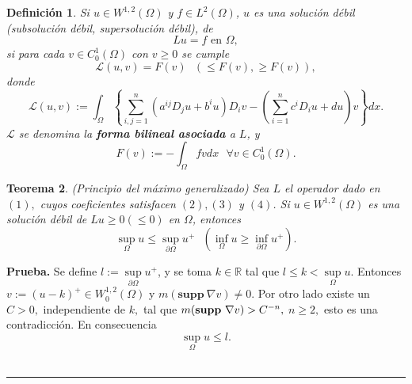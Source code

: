 \documentclass{article}
\newtheorem{theorem}{Teorema}
\newtheorem{definition}[theorem]{Definici\'{o}n}
\newenvironment{proof}[1][Prueba]{\textbf{#1.} }{\ \rule{0.5em}{0.5em}}
\begin{document}
\begin{definition}
Si $u\in W^{1,2}(\Omega )$ y $f\in L^{2}\left( \Omega \right) $, $u$ es una
soluci\'{o}n d\'{e}bil (subsoluci\'{o}n d\'{e}bil, supersoluci\'{o}n
d\'{e}bil), de 
\begin{equation*}
Lu=f\text{ \ \ en }\Omega ,
\end{equation*}
si para cada $v\in C_{0}^{1}\left( \Omega \right) $ con $v\geq 0$ se cumple 
\begin{equation}
\mathcal{L}\left( u,v\right) =F\left( v\right) \text{ \ }\left( \leq F\left(
v\right) ,\geq F\left( v\right) \right) ,  \tag{5}
\end{equation}
donde 
\begin{equation}
\mathcal{L}\left( u,v\right) :=\int_{\Omega }\left\{ \sum_{i,j=1}^{n}\left(
a^{ij}D_{j}u+b^{i}u\right) D_{i}v-\left( \sum_{i=1}^{n}c^{i}D_{i}u+du\right)
v\right\} dx.  \tag{6}
\end{equation}
$\mathcal{L}$ se denomina la \textbf{forma bilineal asociada} a $L$, y 
\begin{equation}
F\left( v\right) :=-\int_{\Omega }fvdx\text{ \ }\forall v\in C_{0}^{1}\left(
\Omega \right) .  \tag{7}
\end{equation}
\end{definition}

\begin{theorem}
(Principio del m\'{a}ximo generalizado) Sea $L$ el operador dado en $(1),$
cuyos coeficientes satisfacen $\left( 2\right) ,\left( 3\right) $ y $\left(
4\right) $. Si $u\in W^{1,2}\left( \Omega \right) $ es una soluci\'{o}n
d\'{e}bil de $Lu\geq 0\left( \leq 0\right) $ en $\Omega $, entonces 
\begin{equation*}
\sup_{\Omega }u\leq \sup_{\partial \Omega }u^{+}\text{ \ }\left(
\inf_{\Omega }u\geq \inf_{\partial \Omega }u^{+}\right) .
\end{equation*}
\end{theorem}

\begin{proof}
Se define $l:=\sup\limits_{\partial \Omega }u^{+}$, y se toma $k\in \mathbb{R%
}$ tal que $l\leq k<\sup\limits_{\Omega }u$. Entonces $v:=\left( u-k\right)
^{+}\in W_{0}^{1,2}\left( \Omega \right) $ y $m(\mathbf{supp\ }\nabla v)\neq
0.$ Por otro lado existe un $C>0,$ independiente de $k,$ tal que $m(\mathbf{%
supp\ }\nabla v)>C^{-n},$ $n\geq 2,$ esto es una contradicci\'{o}n. En
consecuencia 
\begin{equation*}
\sup_{\Omega }u\leq l\text{.}
\end{equation*}
\end{proof}
\end{document}
